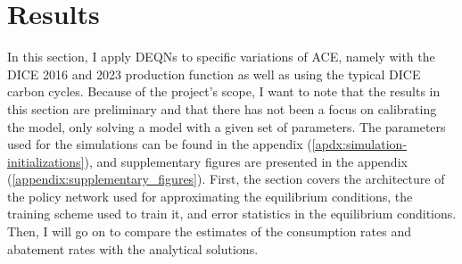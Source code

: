 \section{Results}
\label{sec:results}

In this section, I apply DEQNs to specific variations of ACE, namely with the DICE 2016 and 2023 production function as well as using the typical DICE carbon cycles. Because of the project's scope, I want to note that the results in this section are preliminary and that there has not been a focus on calibrating the model, only solving a model with a given set of parameters. The parameters used for the simulations can be found in the appendix (\ref{apdx:simulation-initializations}), and supplementary figures are presented in the appendix (\ref{appendix:supplementary_figures}). First, the section covers the architecture of the policy network used for approximating the equilibrium conditions, the training scheme used to train it, and error statistics in the equilibrium conditions. Then, I will go on to compare the estimates of the consumption rates and abatement rates with the analytical solutions.






